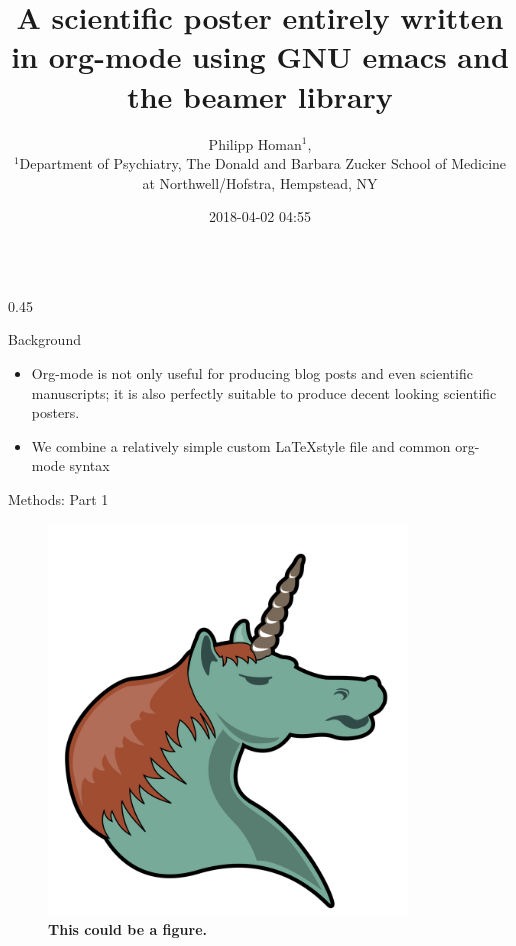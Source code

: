 \documentclass[final]{beamer}
\date{}
\author{
Philipp Homan$^{1}$,
\\
\normalsize{$^{1}$Department of Psychiatry,}
\normalsize{The Donald and Barbara Zucker}
\normalsize{School of Medicine at Northwell/Hofstra,}
\normalsize{Hempstead, NY}\\
}
\date{2018-04-02 04:55}
\title{A scientific poster entirely written in org-mode using GNU emacs and the beamer library}
\begin{document}
\begin{frame}[label={sec:org8f3d3e7}]{}
\begin{columns}
\begin{column}[t]{0.45\textwidth\columnwidth}
\begin{block}{Background}
\begin{itemize}
\item Org-mode is not only useful for producing blog posts and even
scientific manuscripts; it is also perfectly suitable to produce
decent looking scientific posters.
\item We combine a relatively simple custom \LaTeX style file and common
org-mode syntax
\end{itemize}
\end{block}

\begin{block}{Methods: Part 1}
\captionsetup{justification=justified,width=.85\linewidth}
\begin{figure}[htbp]
\centering
\includegraphics[width=0.85\textwidth]{org-mode-poster-1.png}
\caption{\label{fig:orga7530f0}
\textbf{This could be a figure.}}
\end{figure}
\end{block}


\end{column}
\end{columns}
\end{frame}
\end{document}
